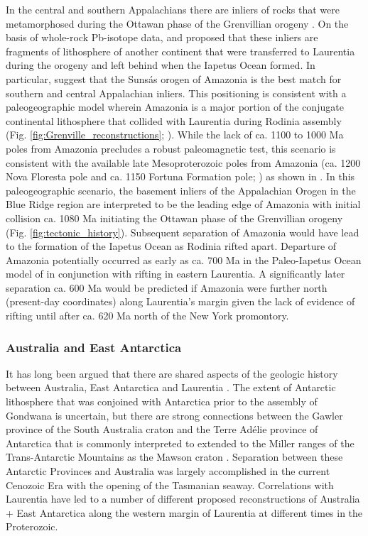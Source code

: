 \documentclass[twocolumn, switch]{article} %
\begin{document}
In the central and southern Appalachians there are inliers of rocks that were metamorphosed during the Ottawan phase of the Grenvillian orogeny \citep{McLelland2013a}. On the basis of whole-rock Pb-isotope data, \cite{Loewy2003a} and \cite{Fisher2010a} proposed that these inliers are fragments of lithosphere of another continent that were transferred to Laurentia during the orogeny and left behind when the Iapetus Ocean formed. In particular, \cite{Fisher2010a} suggest that the Suns\'as orogen of Amazonia is the best match for southern and central Appalachian inliers. This positioning is consistent with a paleogeographic model wherein Amazonia is a major portion of the conjugate continental lithosphere that collided with Laurentia during Rodinia assembly (Fig. \ref{fig:Grenville_reconstructions}; \citealp{Hoffman1991a, Evans2013b, Cawood2017a}). While the lack of ca. 1100 to 1000 Ma poles from Amazonia precludes a robust paleomagnetic test, this scenario is consistent with the available late Mesoproterozoic poles from Amazonia (ca. 1200 Nova Floresta pole and ca. 1150 Fortuna Formation pole; \citealp{DAgrella-Filho2021a}) as shown in \cite{Evans2013b}. In this paleogeographic scenario, the basement inliers of the Appalachian Orogen in the Blue Ridge region are interpreted to be the leading edge of Amazonia with initial collision ca. 1080 Ma initiating the Ottawan phase of the Grenvillian orogeny (Fig. \ref{fig:tectonic_history}). Subsequent separation of Amazonia would have lead to the formation of the Iapetus Ocean as Rodinia rifted apart. Departure of Amazonia potentially occurred as early as ca. 700 Ma in the Paleo-Iapetus Ocean model of  \citet{Robert2020a} in conjunction with rifting in eastern Laurentia. A significantly later separation ca. 600 Ma would be predicted if Amazonia were further north (present-day coordinates) along Laurentia's margin given the lack of evidence of rifting until after ca. 620 Ma north of the New York promontory.

\subsubsection{Australia and East Antarctica}

It has long been argued that there are shared aspects of the geologic history between Australia, East Antarctica and Laurentia \citep{Moores1991a}. The extent of Antarctic lithosphere that was conjoined with Antarctica prior to the assembly of Gondwana is uncertain, but there are strong connections between the Gawler province of the South Australia craton and the Terre Ad\'elie province of Antarctica that is commonly interpreted to extended to the Miller ranges of the Trans-Antarctic Mountains as the Mawson craton \citep{Payne2009b}.  Separation between these Antarctic Provinces and Australia was largely accomplished in the current Cenozoic Era with the opening of the Tasmanian seaway. Correlations with Laurentia have led to a number of different proposed reconstructions of Australia + East Antarctica along the western margin of Laurentia at different times in the Proterozoic.
\end{document}
